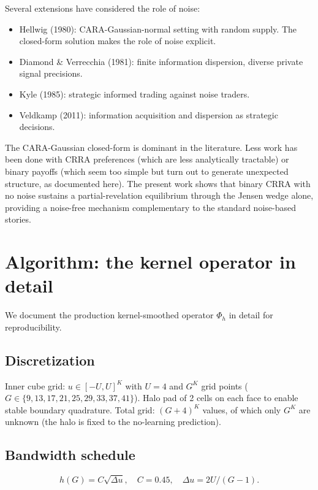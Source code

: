 \documentclass[11pt]{article}
\newcommand{\1}{\mathbf{1}}
\begin{document}
Several extensions have considered the role of noise:
\begin{itemize}
\item Hellwig (1980): CARA-Gaussian-normal setting with random supply.
The closed-form solution makes the role of noise explicit.
\item Diamond \& Verrecchia (1981): finite information dispersion,
diverse private signal precisions.
\item Kyle (1985): strategic informed trading against noise traders.
\item Veldkamp (2011): information acquisition and dispersion as
strategic decisions.
\end{itemize}

The CARA-Gaussian closed-form is dominant in the literature.  Less work
has been done with CRRA preferences (which are less analytically
tractable) or binary payoffs (which seem too simple but turn out to
generate unexpected structure, as documented here).  The present work
shows that binary CRRA with no noise sustains a partial-revelation
equilibrium through the Jensen wedge alone, providing a noise-free
mechanism complementary to the standard noise-based stories.

\section{Algorithm: the kernel operator in detail}
\label{app:kernel}

We document the production kernel-smoothed operator $\Phi_h$ in detail
for reproducibility.

\subsection{Discretization}

Inner cube grid: $u \in [-U, U]^K$ with $U=4$ and $G^K$ grid points
($G \in \{9, 13, 17, 21, 25, 29, 33, 37, 41\}$).  Halo pad of 2 cells
on each face to enable stable boundary quadrature.  Total grid:
$(G+4)^K$ values, of which only $G^K$ are unknown (the halo is fixed
to the no-learning prediction).

\subsection{Bandwidth schedule}

\begin{equation}
h(G) = C \sqrt{\Delta u}, \quad C = 0.45, \quad \Delta u = 2U/(G-1).
\end{equation}
\end{document}

